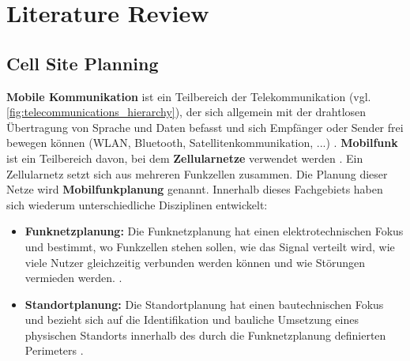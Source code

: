 \chapter{Literature Review}
\label{sec:literature_review}

\section{Cell Site Planning}



\begin{German}
    \textbf{Mobile Kommunikation} ist ein Teilbereich der Telekommunikation (vgl. \ref{fig:telecommunications_hierarchy}), der sich allgemein mit der drahtlosen Übertragung von Sprache und Daten befasst und sich Empfänger oder Sender frei bewegen können (WLAN, Bluetooth, Satellitenkommunikation, ...) \cite{bundesamtfurstrahlenschutzWhatMobileCommunication}. \textbf{Mobilfunk} ist ein Teilbereich davon, bei dem \textbf{Zellularnetze} verwendet werden \cite{jiangCellularCommunicationNetworks2024}. Ein Zellularnetz setzt sich aus mehreren Funkzellen zusammen. Die Planung dieser Netze wird \textbf{Mobilfunkplanung} genannt. Innerhalb dieses Fachgebiets haben sich wiederum unterschiedliche Disziplinen entwickelt:

    \begin{itemize}
        \item \textbf{Funknetzplanung:} Die Funknetzplanung hat einen elektrotechnischen Fokus und bestimmt, wo Funkzellen stehen sollen, wie das Signal verteilt wird, wie viele Nutzer gleichzeitig verbunden werden können und wie Störungen vermieden werden. \cite{academyforlorawanrAcademyLoRaWANWhat,telecomtrainerRNPRadioNetwork2023}.

        \item \textbf{Standortplanung:} Die Standortplanung hat einen bautechnischen Fokus und bezieht sich auf die Identifikation und bauliche Umsetzung eines physischen Standorts innerhalb des durch die Funknetzplanung definierten Perimeters \cite{habibPDFStudyCell2024}.
    \end{itemize}
\end{German}
    
